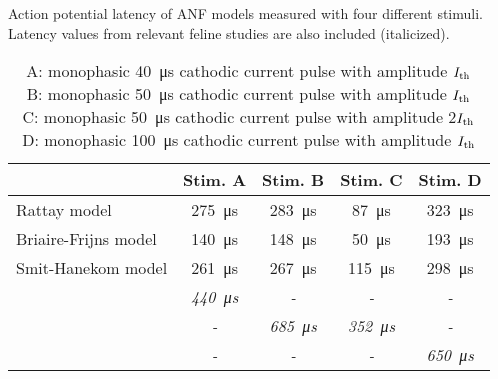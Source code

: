 \begin{table}[htb]
\centering
\caption{Action potential latency of ANF models measured with four different stimuli. Latency values from relevant feline studies are also included (italicized).}
\begin{tabular}{l|cccc}
& Stim. A & Stim. B & Stim. C & Stim. D\\\hline
Rattay model & \SI{275}{\micro\second} & \SI{283}{\micro\second} & \SI{87}{\micro\second} & \SI{323}{\micro\second}\\
Briaire-Frijns model & \SI{140}{\micro\second} & \SI{148}{\micro\second} & \SI{50}{\micro\second} & \SI{193}{\micro\second}\\
Smit-Hanekom model & \SI{261}{\micro\second} & \SI{267}{\micro\second} & \SI{115}{\micro\second} & \SI{298}{\micro\second}\\
\textit{\cite{Cartee2000}} & \textit{\SI{440}{\micro\second}} & \textit{-} & \textit{-} & \textit{-}\\
\textit{\cite{VandenHonert1984}} & \textit{-} & \textit{\SI{685}{\micro\second}} & \textit{\SI{352}{\micro\second}} & \textit{-}\\
\textit{\cite{Miller1999}} & \textit{-} & \textit{-} & \textit{-} & \textit{\SI{650}{\micro\second}}\\
\hline
\end{tabular}
\caption*{A: monophasic \SI{40}{\micro\second} cathodic current pulse with amplitude $I_{\text{th}}$\\
B: monophasic \SI{50}{\micro\second} cathodic current pulse with amplitude $I_{\text{th}}$\\
C: monophasic \SI{50}{\micro\second} cathodic current pulse with amplitude 2$I_{\text{th}}$\\
D: monophasic \SI{100}{\micro\second} cathodic current pulse with amplitude $I_{\text{th}}$\\
}
\label{tbl:latency_comparison}
\end{table}
